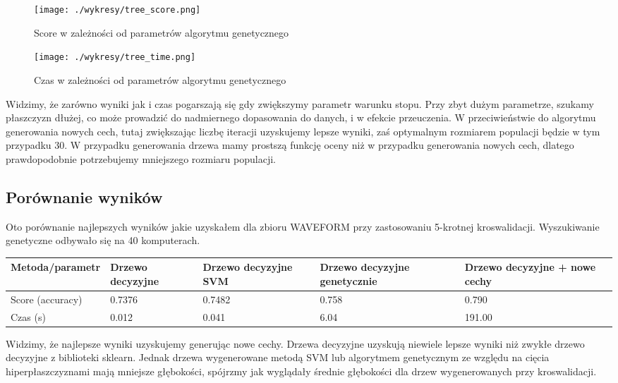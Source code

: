 \documentclass[magisterska]{pracamgr}
\theoremstyle{plain}
\theoremstyle{definition}
\theoremstyle{remark}
\begin{document}
  
\begin{figure}
 \caption{Score w zależności od parametrów algorytmu genetycznego}
 \centering\texttt{[image: ./wykresy/tree\_score.png]}
\end{figure}

\begin{figure}
 \caption{Czas w zależności od parametrów algorytmu genetycznego}
 \centering\texttt{[image: ./wykresy/tree\_time.png]}
\end{figure}

Widzimy, że zarówno wyniki jak i czas pogarszają się gdy zwiększymy parametr warunku stopu. Przy zbyt dużym parametrze, 
szukamy płaszczyzn dłużej, co może prowadzić do nadmiernego dopasowania do danych, i w efekcie przeuczenia.
W przeciwieństwie do algorytmu generowania nowych cech, tutaj zwiększając liczbę iteracji uzyskujemy lepsze wyniki,
zaś optymalnym rozmiarem populacji będzie w tym przypadku 30. W przypadku generowania drzewa mamy prostszą funkcję
oceny niż w przypadku generowania nowych cech, dlatego prawdopodobnie potrzebujemy mniejszego rozmiaru populacji.

\subsection{Porównanie wyników}
Oto porównanie najlepszych wyników jakie uzyskałem dla zbioru WAVEFORM przy zastosowaniu 5-krotnej kroswalidacji.
Wyszukiwanie genetyczne odbywało się na 40 komputerach.

\begin{center}
 \begin{tabular}{l || P{2.5cm} | P{2.5cm} | P{2.5cm} | P{2.5cm}}
  Metoda/parametr     & Drzewo decyzyjne & Drzewo decyzyjne SVM & Drzewo decyzyjne genetycznie & Drzewo decyzyjne + nowe cechy \\ 
  \hline
  Score (accuracy) & 0.7376     & 0.7482     & 0.758          & 0.790 \\
  Czas (s) & 0.012     & 0.041      & 6.04    & 191.00 \\
 \end{tabular}
\end{center}

Widzimy, że najlepsze wyniki uzyskujemy generując nowe cechy. Drzewa decyzyjne uzyskują niewiele lepsze wyniki niż zwykłe 
drzewo decyzyjne z biblioteki sklearn. Jednak drzewa wygenerowane metodą SVM lub algorytmem genetycznym ze względu na cięcia hiperpłaszczyznami
mają mniejsze głębokości, spójrzmy jak wyglądały średnie głębokości dla drzew wygenerowanych przy kroswalidacji.
\end{document}
